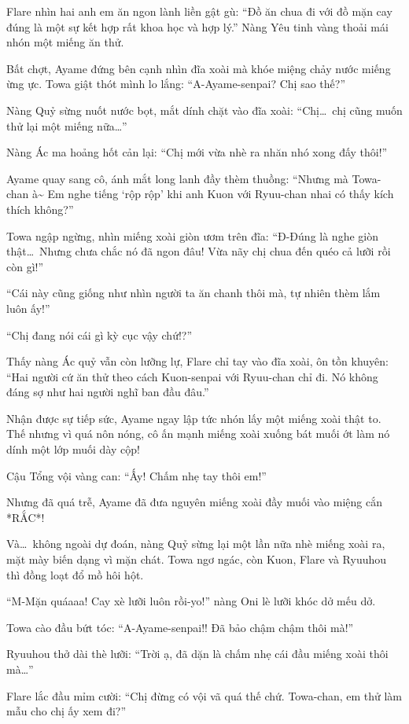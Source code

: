 \documentclass[../main.tex]{subfiles}
\begin{document}
Flare nhìn hai anh em ăn ngon lành liền gật gù: ``Đồ ăn chua đi với đồ mặn cay đúng là một sự kết hợp rất khoa học và hợp lý.'' Nàng Yêu tinh vàng thoải mái nhón một miếng ăn thử.

Bất chợt, Ayame đứng bên cạnh nhìn đĩa xoài mà khóe miệng chảy nước miếng ừng ực. Towa giật thót mình lo lắng: ``A-Ayame-senpai? Chị sao thế?''

Nàng Quỷ sừng nuốt nước bọt, mắt dính chặt vào đĩa xoài: ``Chị\dots\ chị cũng muốn thử lại một miếng nữa\dots''

Nàng Ác ma hoảng hốt cản lại: ``Chị mới vừa nhè ra nhăn nhó xong đấy thôi!''

Ayame quay sang cô, ánh mắt long lanh đầy thèm thuồng: ``Nhưng mà Towa-chan à\~{} Em nghe tiếng `rộp rộp' khi anh Kuon với Ryuu-chan nhai có thấy kích thích không?''

Towa ngập ngừng, nhìn miếng xoài giòn ươm trên đĩa: ``Đ-Đúng là nghe giòn thật\dots\ Nhưng chưa chắc nó đã ngon đâu! Vừa nãy chị chua đến quéo cả lưỡi rồi còn gì!''

``Cái này cũng giống như nhìn người ta ăn chanh thôi mà, tự nhiên thèm lắm luôn ấy!''

``Chị đang nói cái gì kỳ cục vậy chứ!?''

Thấy nàng Ác quỷ vẫn còn lưỡng lự, Flare chỉ tay vào đĩa xoài, ôn tồn khuyên: ``Hai người cứ ăn thử theo cách Kuon-senpai với Ryuu-chan chỉ đi. Nó không đáng sợ như hai người nghĩ ban đầu đâu.''

Nhận được sự tiếp sức, Ayame ngay lập tức nhón lấy một miếng xoài thật to. Thế nhưng vì quá nôn nóng, cô ấn mạnh miếng xoài xuống bát muối ớt làm nó dính một lớp muối dày cộp!

Cậu Tổng vội vàng can: ``Ấy! Chấm nhẹ tay thôi em!''

Nhưng đã quá trễ, Ayame đã đưa nguyên miếng xoài đầy muối vào miệng cắn *RẮC*!

Và\dots\ không ngoài dự đoán, nàng Quỷ sừng lại một lần nữa nhè miếng xoài ra, mặt mày biến dạng vì mặn chát. Towa ngơ ngác, còn Kuon, Flare và Ryuuhou thì đồng loạt đổ mồ hôi hột.

``M-Mặn quáaaa! Cay xè lưỡi luôn rồi-yo!'' nàng Oni lè lưỡi khóc dở mếu dở.

Towa cào đầu bứt tóc: ``A-Ayame-senpai!! Đã bảo chậm chậm thôi mà!''

Ryuuhou thở dài thè lưỡi: ``Trời ạ, đã dặn là chấm nhẹ cái đầu miếng xoài thôi mà\dots''

Flare lắc đầu mỉm cười: ``Chị đừng có vội vã quá thế chứ. Towa-chan, em thử làm mẫu cho chị ấy xem đi?''
\end{document}

